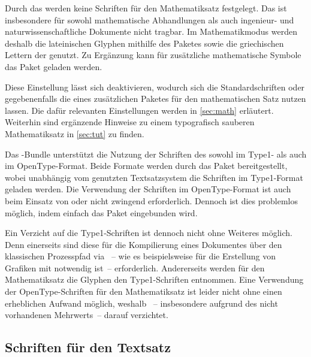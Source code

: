 \begin{DeclareEntity*}{}
\begin{DeclareEntity*}{}
\begin{DeclareEntity*}{}
%
Durch das \CD werden keine Schriften für den Mathematiksatz festgelegt. Das ist 
insbesondere für sowohl mathematische Abhandlungen als auch ingenieur- und 
naturwissenschaftliche Dokumente nicht tragbar. Im Mathematikmodus werden 
deshalb die lateinischen Glyphen mithilfe des Paketes 
sowie die griechischen Lettern der \OpenSans genutzt. Zu Ergänzung kann für 
zusätzliche mathematische Symbole das Paket  geladen werden.

Diese Einstellung lässt sich deaktivieren, wodurch sich die Standardschriften 
oder gegebenenfalls die eines zusätzlichen Paketes für den mathematischen Satz 
nutzen lassen. Die dafür relevanten Einstellungen werden in \autoref{sec:math} 
erläutert. Weiterhin sind ergänzende Hinweise zu einem typografisch sauberen
Mathematiksatz in \autoref{sec:tut} zu finden.



%
Das \TUDScript-Bundle unterstützt die Nutzung der Schriften des \CDs sowohl 
im Type1- als auch im OpenType-Format. Beide Formate werden durch das Paket 
 bereitgestellt, wobei unabhängig vom genutzten 
Textsatzsystem die Schriften im Type1-Format geladen werden. Die Verwendung 
der Schriften im OpenType-Format ist auch beim Einsatz von  
oder  nicht zwingend erforderlich. Dennoch ist dies problemlos 
möglich, indem einfach das Paket  eingebunden wird.

Ein Verzicht auf die Type1-Schriften ist dennoch nicht ohne Weiteres möglich. 
Denn einerseits sind diese für die Kompilierung eines Dokumentes über den 
klassischen Prozesspfad via ~-- wie es 
beispielsweise für die Erstellung von Grafiken mit  notwendig 
ist~-- erforderlich. Andererseits werden für den Mathematiksatz die Glyphen den 
Type1-Schriften entnommen. Eine Verwendung der OpenType-Schriften für den 
Mathematiksatz ist leider nicht ohne einen erheblichen Aufwand möglich, weshalb 
\TUDScript~-- insbesondere aufgrund des nicht vorhandenen Mehrwerts~-- darauf 
verzichtet.



\subsection{%
  Schriften für den Textsatz%
  \label{sec:text}%
}


\end{DeclareEntity*}
\end{DeclareEntity*}
\end{DeclareEntity*}
